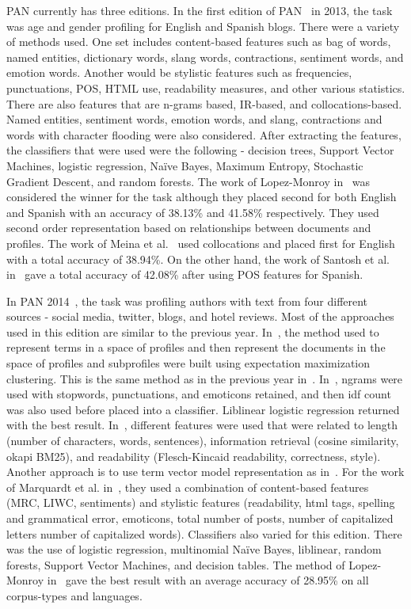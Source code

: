 \documentclass[a4paper]{llncs}
\begin{document}
PAN currently has three editions. In the first edition of PAN~\cite{rangel2013overview} in 2013, the task  was age and gender profiling for English and Spanish blogs. There were a variety of methods used. One set includes content-based features such as bag of words, named entities, dictionary words, slang words, contractions, sentiment words, and emotion words. Another would be stylistic features such as frequencies, punctuations, POS, HTML use, readability measures, and other various statistics. There are also features that are n-grams based, IR-based, and collocations-based. Named entities, sentiment words, emotion words, and slang, contractions and words with character flooding were also considered. After extracting the features, the classifiers that were used were the following - decision trees, Support Vector Machines, logistic regression, Naïve Bayes, Maximum Entropy, Stochastic Gradient Descent, and random forests. The work of Lopez-Monroy in~\cite{lopez2013inaoe} was considered the winner for the task although they placed second for both English and Spanish with an accuracy of 38.13\% and 41.58\% respectively. They used second order representation based on relationships between documents and profiles. The work of Meina et al.~\cite{meina2013ensemble} used collocations and placed first for English with a total accuracy of 38.94\%. On the other hand, the work of Santosh et al. in~\cite{santosh2013author} gave a total accuracy of 42.08\% after using POS features for Spanish.

In PAN 2014~\cite{rangel2014overview}, the task was profiling authors with text from four different sources - social media, twitter, blogs, and hotel reviews. Most of the approaches used in this edition are similar to the previous year. In~\cite{lopezusing}, the method used to represent terms in a space of profiles and then represent the documents in the space of profiles and subprofiles were built using expectation maximization clustering. This is the same method as in the previous year in~\cite{lopez2013inaoe}. In~\cite{maharjansimple}, ngrams were used with stopwords, punctuations, and emoticons retained, and then idf count was also used before placed into a classifier. Liblinear logistic regression returned with the best result. In~\cite{weren6exploring}, different features were used that were related to length (number of characters, words, sentences), information retrieval (cosine similarity, okapi BM25), and readability (Flesch-Kincaid readability, correctness, style). Another approach is to use term vector model representation as in~\cite{villenadaedalus}. For the work of Marquardt et al. in~\cite{marquardt2014age}, they used a combination of content-based features (MRC, LIWC, sentiments) and stylistic features (readability, html tags, spelling and grammatical error, emoticons, total number of posts, number of capitalized letters number of capitalized words). Classifiers also varied for this edition. There was the use of logistic regression, multinomial Naïve Bayes, liblinear, random forests, Support Vector Machines, and decision tables. The method of Lopez-Monroy in~\cite{lopezusing} gave the best result with an average accuracy of 28.95\% on all corpus-types and languages. 
\end{document}
